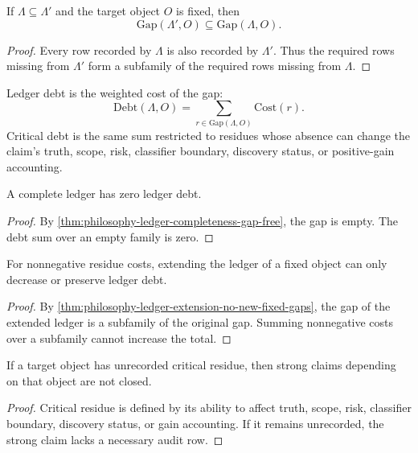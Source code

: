 \begin{theorem}
\label{thm:philosophy-ledger-extension-no-new-fixed-gaps}
If $\Lambda\subseteq\Lambda'$ and the target object $O$ is fixed, then
$$
\mathrm{Gap}(\Lambda',O)\subseteq\mathrm{Gap}(\Lambda,O).
$$
\end{theorem}
\begin{proof}
Every row recorded by $\Lambda$ is also recorded by $\Lambda'$. Thus the
required rows missing from $\Lambda'$ form a subfamily of the required
rows missing from $\Lambda$.
\end{proof}

\begin{definition}
\label{def:philosophy-ledger-debt}
Ledger debt is the weighted cost of the gap:
$$
\mathrm{Debt}(\Lambda,O)
=
\sum_{r\in\mathrm{Gap}(\Lambda,O)}\mathrm{Cost}(r).
$$
Critical debt is the same sum restricted to residues whose absence can
change the claim's truth, scope, risk, classifier boundary, discovery
status, or positive-gain accounting.
\end{definition}

\begin{theorem}
\label{thm:philosophy-complete-ledger-zero-debt}
A complete ledger has zero ledger debt.
\end{theorem}
\begin{proof}
By \autoref{thm:philosophy-ledger-completeness-gap-free}, the gap is
empty. The debt sum over an empty family is zero.
\end{proof}

\begin{theorem}
\label{thm:philosophy-ledger-debt-monotone-extension}
For nonnegative residue costs, extending the ledger of a fixed object can
only decrease or preserve ledger debt.
\end{theorem}
\begin{proof}
By \autoref{thm:philosophy-ledger-extension-no-new-fixed-gaps}, the gap
of the extended ledger is a subfamily of the original gap. Summing
nonnegative costs over a subfamily cannot increase the total.
\end{proof}

\begin{theorem}
\label{thm:philosophy-critical-debt-blocks-strong-claims}
If a target object has unrecorded critical residue, then strong claims
depending on that object are not closed.
\end{theorem}
\begin{proof}
Critical residue is defined by its ability to affect truth, scope, risk,
classifier boundary, discovery status, or gain accounting. If it remains
unrecorded, the strong claim lacks a necessary audit row.
\end{proof}

